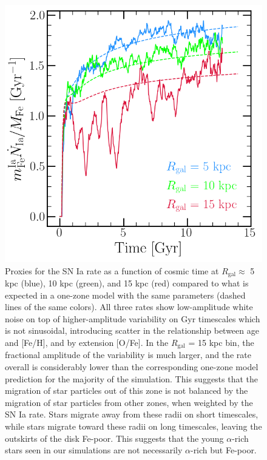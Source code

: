 \documentclass[12pt]{report}
\begin{document}
\begin{figure}[!h] 
\centering 
\includegraphics[scale = 0.7]{../plots/Ia_rate/moddisk_vigorousSF.png} 
\caption{
Proxies for the SN Ia rate as a function of cosmic time at 
$R_\text{gal} \approx$ 5 kpc (blue), 10 kpc (green), and 15 kpc (red) compared 
to what is expected in a one-zone model with the same parameters (dashed lines 
of the same colors). All three rates show low-amplitude white noise on top of 
higher-amplitude variability on Gyr timescales which is not sinusoidal, 
introducing scatter in the relationship between age and [Fe/H], and by 
extension [O/Fe]. In the $R_\text{gal}$ = 15 kpc bin, the fractional amplitude 
of the variability is much larger, and the rate overall is considerably lower 
than the corresponding one-zone model prediction for the majority of the 
simulation. This suggests that the migration of star particles out of this 
zone is not balanced by the migration of star particles from other zones, when 
weighted by the SN Ia rate. Stars migrate away from these radii on short 
timescales, while stars migrate toward these radii on long timescales, leaving 
the outskirts of the disk Fe-poor. This suggests that the young $\alpha$-rich 
stars seen in our simulations are not necessarily $\alpha$-rich but Fe-poor. 
}
\end{figure}
\end{document}
